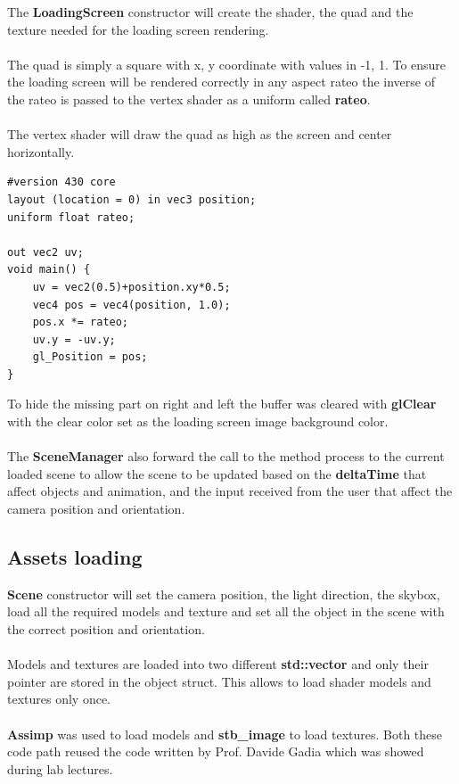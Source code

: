 \documentclass[12pt, a4paper]{article}
\begin{document}
The \textbf{LoadingScreen} constructor will create the shader, the quad and the texture needed for the loading screen
rendering.\\\\
The quad is simply a square with x, y coordinate with values in -1, 1. To ensure the loading screen will be rendered correctly
in any aspect rateo the inverse of the rateo is passed to the vertex shader as a uniform called \textbf{rateo}.\\\\
The vertex shader will draw the quad as high as the screen and center horizontally.
\begin{lstlisting}[caption={Loading screen vertex shader},captionpos=b]
#version 430 core
layout (location = 0) in vec3 position;
uniform float rateo;
    
out vec2 uv;
void main() {
    uv = vec2(0.5)+position.xy*0.5;
    vec4 pos = vec4(position, 1.0);
    pos.x *= rateo;
    uv.y = -uv.y;
    gl_Position = pos;
}
\end{lstlisting}
To hide the missing part on right and left
the buffer was cleared with \textbf{glClear} with the clear color set as the loading screen image background color.\\\\
The \textbf{SceneManager} also forward the call to the method process to the current loaded scene to allow the scene
to be updated based on the \textbf{deltaTime} that affect objects and animation, and the input received from the user
that affect the camera position and orientation.

\subsection{Assets loading}
\textbf{Scene} constructor will set the camera position, the light direction, the skybox, load all the required models and texture
and set all the object in the scene with the correct position and orientation.\\\\
Models and textures are loaded into two different \textbf{std::vector} and only their pointer are stored in the object struct.
This allows to load shader models and textures only once.\\\\
\textbf{Assimp} was used to load models and \textbf{stb\_image} to load textures. Both these code path
reused the code written by Prof. Davide Gadia which was showed during lab lectures.
\end{document}
